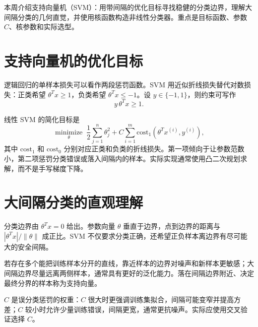 


\begin{summarybox}
本周介绍支持向量机（SVM）：用带间隔的优化目标寻找稳健的分类边界，理解大间隔分类的几何直觉，并使用核函数构造非线性分类器。重点是目标函数、参数 $C$、核参数和实际选型。
\end{summarybox}

\section{支持向量机的优化目标}
\begin{definitionbox}
逻辑回归的单样本损失可以看作两段惩罚函数。SVM 用近似折线损失替代对数损失：正类希望 $\theta^Tx\geq1$，负类希望 $\theta^Tx\leq-1$。设 $y\in\{-1,1\}$，则约束可写作
\[
y\,\theta^Tx\geq1.
\]
\end{definitionbox}
\begin{keybox}[硬间隔与软间隔目标]
线性 SVM 的简化目标是
\[
\underset{\theta}{\operatorname{minimize}}
\;\frac12\sum_{j=1}^{n}\theta_j^2+C\sum_{i=1}^{m}\mathrm{cost}_1(\theta^Tx^{(i)},y^{(i)}),
\]
其中 $\mathrm{cost}_1$ 和 $\mathrm{cost}_0$ 分别对应正类和负类的折线损失。第一项倾向于让参数范数小，第二项惩罚分类错误或落入间隔内的样本。实际实现通常使用凸二次规划求解，而不是手写梯度下降。
\end{keybox}

\section{大间隔分类的直观理解}
\begin{definitionbox}[几何间隔]
分类边界由 $\theta^Tx=0$ 给出。参数向量 $\theta$ 垂直于边界，点到边界的距离与 $|\theta^Tx|/\|\theta\|$ 成正比。SVM 不仅要求分类正确，还希望正负样本离边界有尽可能大的安全间隔。
\end{definitionbox}
\begin{examplebox}[为什么间隔更稳健]
若存在多个能把训练样本分开的直线，靠近样本的边界对噪声和新样本更敏感；大间隔边界尽量远离两侧样本，通常具有更好的泛化能力。落在间隔边界附近、决定最终分界的样本称为支持向量。
\end{examplebox}
\begin{tipbox}[$C$ 的作用]
$C$ 是误分类惩罚的权重：$C$ 很大时更强调训练集拟合，间隔可能变窄并提高方差；$C$ 较小时允许少量训练错误，间隔更宽，通常更抗噪声。实际应使用交叉验证选择 $C$。
\end{tipbox}


